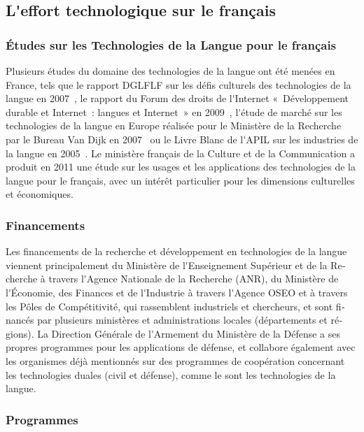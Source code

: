\documentclass[]{../metanetpaper}
\begin{document}
\begin{french}
\begin{multicols}{2}
\subsection{L{\mbox '}effort technologique sur le français}

\subsubsection{Études sur les Technologies de la Langue pour le français}

Plusieurs études du domaine des technologies de la langue ont été
menées en France, tels que le rapport DGLFLF sur les défis culturels
des technologies de la langue en 2007~\cite{dglflf07}, le rapport du
Forum des droits de l{\mbox '}Internet «~Développement durable et
  Internet~: langues et Internet~» en 2009~\cite{droitsinternet07},
l{\mbox '}étude de marché sur les technologies de la langue en Europe
réalisée pour le Ministère de la Recherche par le Bureau Van Dijk en
2007~\cite{vandijk07} ou le Livre Blanc de l{\mbox '}APIL sur les
industries de la langue en 2005~\cite{apil05}. Le ministère français
de la Culture et de la Communication a produit en 2011 une étude sur
les usages et les applications des technologies de la langue pour le
français, avec un intérêt particulier pour les dimensions culturelles
et économiques.

\subsubsection{Financements}

Les financements de la recherche et développement en technologies de
la langue viennent principalement du Ministère de l{\mbox '}Enseignement
Supérieur et de la Recherche à travers l{\mbox '}Agence Nationale de la
Recherche (ANR), du Ministère de l{\mbox '}Économie, des Finances et de
l{\mbox '}Industrie à travers l{\mbox '}Agence OSEO et à travers les Pôles de
Compétitivité, qui rassemblent industriels et chercheurs, et sont
financés par plusieurs ministères et administrations locales
(départements et régions). La Direction Générale de l{\mbox '}Armement du
Ministère de la Défense a ses propres programmes pour les applications
de défense, et collabore également avec les organismes déjà mentionnés
sur des programmes de coopération concernant les technologies duales
(civil et défense), comme le sont les technologies de la langue.

\subsubsection{Programmes}


\end{multicols}
\end{french}
\end{document}
